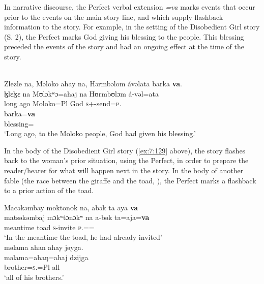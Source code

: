 In narrative discourse, the Perfect verbal extension \textit{=va} marks events that occur prior to the events on the main story line, and which supply flashback information to the story. For example, in the setting of the Disobedient Girl story (S. 2), the Perfect marks God giving his blessing to the people. This blessing preceded the events of the story  and had an ongoing effect at the time of the story. 


\ea\label{ex:7:143}\\
Zlezle  na,  Məloko  ahay  na,  Hərmbəlom  ávəlata  barka  \textbf{va}.\\
\gll  ɮlɛɮɛ      na   Mʊlɔkʷɔ=ahaj  na  Hʊrmbʊlɔm  á-vəl=ata \\ 
      {long ago}  {\PSP}   Moloko=Pl {\PSP}  God  \textsc{s}+{\IFV}-send=\textsc{p}.{\IO}\\  
      
      \medskip
\gll barka=\textbf{va}\\
     blessing={\PRF}\\
\glt  ‘Long ago, to the Moloko people, God had given his blessing.’\\
\z 

In the body of the Disobedient Girl story (\ref{ex:7:129} above), the story flashes back to the woman’s prior situation, using the Perfect, in order to prepare the reader/hearer for what will happen next in the story. In the body of another fable (the race between the giraffe and the toad, \citealt{Friesen2003}), the Perfect marks a flashback to a prior action of the toad.

\ea\label{ex:7:144}
Macəkəmbay  moktonok  na,  abək  ta  aya  \textbf{va}\\  
\gll  matsəkəmbaj  mɔkʷtɔnɔkʷ   na  a-bək  ta=aja=\textbf{va}\\  
      meantime toad {\PSP} \textsc{s}-invite \textsc{p}.{\DO}={\PLU}={\PRF}\\ 
\glt ‘In the meantime the toad, he had already invited’\\

\medskip
məlama  ahan  ahay  jəyga.\\
\gll məlama=ahaŋ=ahaj  dzijga\\
     brother=\textsc{s}.{\POSS}=Pl  all\\
\glt  ‘all of his brothers.’\\
\z 
{}

